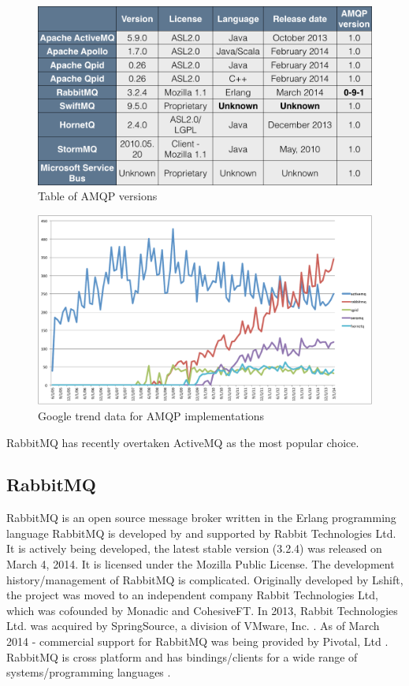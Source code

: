 \documentclass{thesis}
\begin{document}
\begin{figure}[h]
\centering
\includegraphics[scale=.40]{table_of_amqp_message_brokers}  
\caption{Table of AMQP versions }
\end{figure}

\begin{figure}[h]
\centering
\includegraphics[scale=.5]{broker_popularity}  
\caption{Google trend data for AMQP implementations}
\end{figure}

RabbitMQ has recently overtaken ActiveMQ as the most popular choice.


\subsection{RabbitMQ}
RabbitMQ is an open source message broker written in the Erlang programming language \cite{RABBITMQ} RabbitMQ is developed by and supported by Rabbit Technologies Ltd.  It is actively being developed, the latest stable version (3.2.4) was released on March 4, 2014.  It is licensed under the Mozilla Public License.  The development history/management of RabbitMQ is complicated.  Originally developed by Lshift, the project was moved to an independent company Rabbit Technologies Ltd, which was cofounded by Monadic and CohesiveFT.  In 2013, Rabbit Technologies Ltd. was acquired by SpringSource, a division of VMware, Inc. \cite{LSHIFT}.  As of March 2014 - commercial support for RabbitMQ was being provided by Pivotal, Ltd \cite{PIVOTAL}.  RabbitMQ is cross platform and has bindings/clients for a wide range of systems/programming languages \cite{RABBITMQ_CLIENTS}.  
\end{document}
